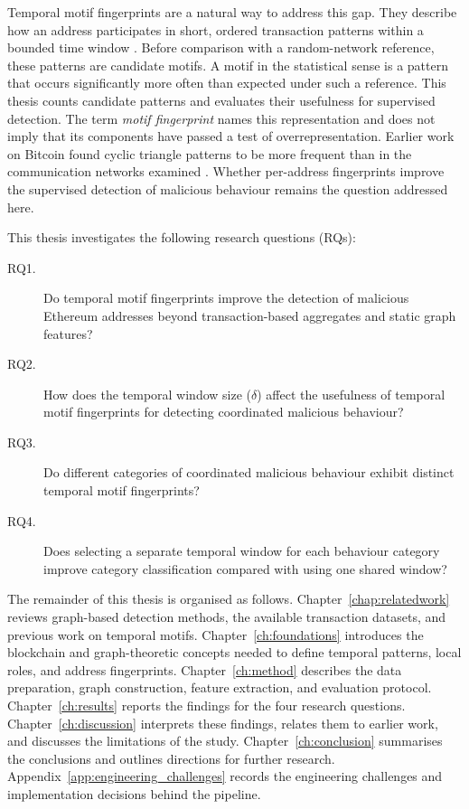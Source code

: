 Temporal motif fingerprints are a natural way to address this gap. They describe how an address participates in short, ordered transaction patterns within a bounded time window \citep{kovanen2011temporal, paranjape2017motifs}. Before comparison with a random-network reference, these patterns are candidate motifs. A motif in the statistical sense is a pattern that occurs significantly more often than expected under such a reference. This thesis counts candidate patterns and evaluates their usefulness for supervised detection. The term \emph{motif fingerprint} names this representation and does not imply that its components have passed a test of overrepresentation. Earlier work on Bitcoin found cyclic triangle patterns to be more frequent than in the communication networks examined \citep{paranjape2017motifs}. Whether per-address fingerprints improve the supervised detection of malicious behaviour remains the question addressed here.

This thesis investigates the following research questions (RQs):

\begin{description}
    \item[RQ1.] Do temporal motif fingerprints improve the detection of
          malicious Ethereum addresses beyond transaction-based aggregates
          and static graph features?
    \item[RQ2.] How does the temporal window size ($\delta$) affect the usefulness of temporal motif fingerprints for detecting coordinated malicious behaviour?
    \item[RQ3.] Do different categories of coordinated malicious behaviour exhibit distinct temporal motif fingerprints?
    \item[RQ4.] Does selecting a separate temporal window for each behaviour
          category improve category classification compared with using one
          shared window?
\end{description}

The remainder of this thesis is organised as follows. Chapter~\ref{chap:relatedwork} reviews graph-based detection methods, the available transaction datasets, and previous work on temporal motifs. Chapter~\ref{ch:foundations} introduces the blockchain and graph-theoretic concepts needed to define temporal patterns, local roles, and address fingerprints. Chapter~\ref{ch:method} describes the data preparation, graph construction, feature extraction, and evaluation protocol. Chapter~\ref{ch:results} reports the findings for the four research questions. Chapter~\ref{ch:discussion} interprets these findings, relates them to earlier work, and discusses the limitations of the study. Chapter~\ref{ch:conclusion} summarises the conclusions and outlines directions for further research. Appendix~\ref{app:engineering_challenges} records the engineering challenges and implementation decisions behind the pipeline.
